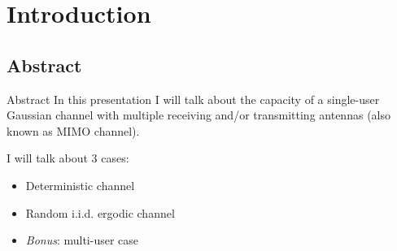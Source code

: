\section{Introduction}

\subsection{Abstract}
\begin{frame}{Abstract}
In this presentation I will talk about the capacity of a single-user Gaussian channel with multiple receiving and/or transmitting antennas \cite{telatar99} (also known as \alert{MIMO} channel).

\myspace
I will talk about 3 cases:
\begin{itemize}
	\item Deterministic channel
	\item Random i.i.d. ergodic channel
	\item \textit{Bonus}: multi-user case
\end{itemize}

\end{frame}

